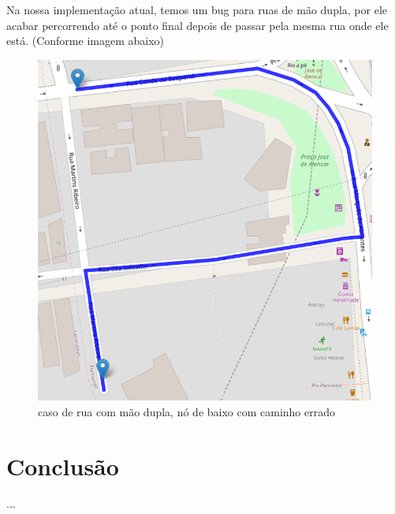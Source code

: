 \documentclass{article}
\begin{document}
Na nossa implementação atual, temos um bug para ruas de mão dupla, por ele acabar percorrendo até o ponto final depois de passar pela mesma rua onde ele está. (Conforme imagem abaixo)

\begin{figure}[H]
    \centering
    \includegraphics[scale=0.5]{EDA_two_way_street_bug.png}
    \caption{caso de rua com mão dupla, nó de baixo com caminho errado}
    \label{fig:my_label}
\end{figure}

\section{Conclusão}
...
\end{document}
